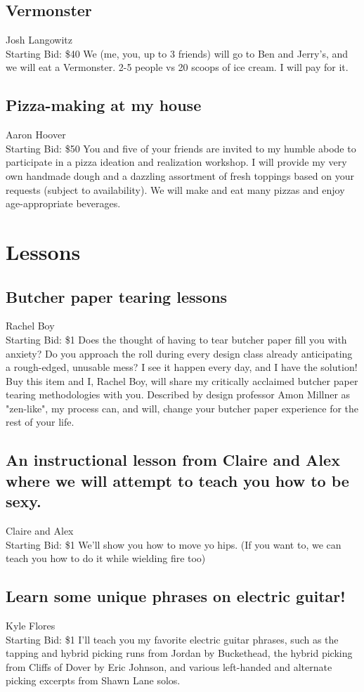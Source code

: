 \documentclass[11pt]{article}
\begin{document}
\subsection{Vermonster}
Josh Langowitz
\\
Starting Bid: \$40
\newline
We (me, you, up to 3 friends) will go to Ben and Jerry's, and we will eat a Vermonster. 2-5 people vs 20 scoops of ice cream. I will pay for it.
\subsection{Pizza-making at my house}
Aaron Hoover
\\
Starting Bid: \$50
\newline
You and five of your friends are invited to my humble abode to participate in a pizza ideation and realization workshop. I will provide my very own handmade dough and a dazzling assortment of fresh toppings based on your requests (subject to availability). We will make and eat many pizzas and enjoy age-appropriate beverages.
\section{Lessons}
\subsection{Butcher paper tearing lessons}
Rachel Boy
\\
Starting Bid: \$1
\newline
Does the thought of having to tear butcher paper fill you with anxiety? Do you approach the roll during every design class already anticipating a rough-edged, unusable mess?  I see it happen every day, and I have the solution! Buy this item and I, Rachel Boy, will share my critically acclaimed butcher paper tearing methodologies with you. Described by design professor Amon Millner as "zen-like", my process can, and will, change your butcher paper experience for the rest of your life.
\subsection{An instructional lesson from Claire and Alex where we will attempt to teach you how to be sexy.}
Claire and Alex
\\
Starting Bid: \$1
\newline
We'll show you how to move yo hips.
(If you want to, we can teach you how to do it while wielding fire too)
\subsection{Learn some unique phrases on electric guitar!}
Kyle Flores
\\
Starting Bid: \$1
\newline
I'll teach you my favorite electric guitar phrases, such as the tapping and hybrid picking runs from Jordan by Buckethead, the hybrid picking from Cliffs of Dover by Eric Johnson, and various left-handed and alternate picking excerpts from Shawn Lane solos.
\end{document}
